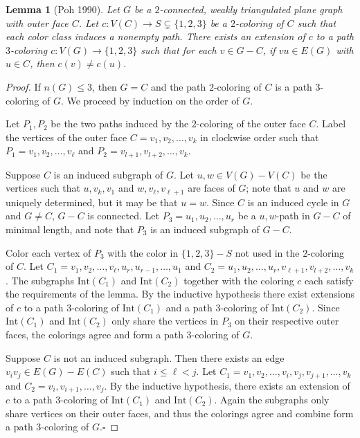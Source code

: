 \documentclass[12pt,letterpaper]{article}
\theoremstyle{plain}
\newtheorem{lemma}{Lemma}[section]           %
\theoremstyle{definition}
\theoremstyle{break}
\newcommand{\ggcqedsymbol}{$\square$}
\newcommand{\ggcqed}{\hbox{}\nobreak\hbox{\quad\ggcqedsymbol}}
\newcommand{\ggcnopf}{\ggcqed}
\begin{document}
\begin{lemma}[Poh 1990]\label{L:planar3c}
Let $G$ be a $2$-connected, weakly triangulated plane graph with outer face
$C$. Let $c:V(C)\to S\subsetneq\{1,2,3\}$ be a $2$-coloring of $C$ such
that each color class induces a nonempty path. There exists an extension of
$c$ to a path $3$-coloring $c:V(G)\to\{1,2,3\}$ such that for each $v\in G-C$, if $vu\in
E(G)$ with $u\in C$, then $c(v)\ne c(u)$.
\end{lemma}

\begin{proof}
If $n(G)\le 3$, then $G=C$ and the path $2$-coloring of $C$ is a path
$3$-coloring of $G$. We proceed by induction on the order of $G$. 

Let $P_1,P_2$ be the two paths induced by the $2$-coloring of the outer face
$C$. 
Label the vertices of the outer face $C=v_1,v_2,\ldots, v_k$ in clockwise
order such that $P_1=v_1,v_2,\ldots, v_\ell$ and
$P_2=v_{l+1},v_{l+2},\ldots, v_k$.

Suppose $C$ is an induced subgraph of $G$. Let
$u,w\in V(G)-V(C)$ be the vertices such that $u,v_k,v_1$ and $w,v_\ell,v_{\ell+1}$
are faces of $G$; note that
$u$ and $w$ are uniquely determined, but it may be that $u=w$. Since
$C$ is an induced cycle in $G$ and $G\ne C$, $G-C$ is connected.
Let $P_3=u_1,u_2,\ldots,u_r$ be a $u,w$-path in $G-C$ of minimal length, and
note that $P_3$ is an induced subgraph of $G-C$.

Color each vertex of $P_3$ with the color in $\{1,2,3\}- S$ not used
in the $2$-coloring of
$C$. Let $C_1=v_1,v_2,\ldots,v_\ell,u_r,u_{r-1},\ldots,u_1$ and
$C_2=u_1,u_2,\ldots,u_r,v_{\ell+1},v_{l+2},\ldots,v_k$. The subgraphs
$\text{Int}(C_1)$ and $\text{Int}(C_2)$ together with the coloring $c$
each satisfy the requirements of the lemma. By the inductive hypothesis
there exist extensions of $c$ to a path
$3$-coloring of $\text{Int}(C_1)$ and a path $3$-coloring of $\text{Int}(C_2)$.
Since $\text{Int}(C_1)$ and $\text{Int}(C_2)$ only share the vertices in $P_3$
on their respective outer faces, the colorings agree and form a path
$3$-coloring of $G$.

Suppose $C$ is not an induced subgraph. Then there
exists an edge $v_iv_j\in E(G)-E(C)$ such that $i\le \ell < j$. Let
$C_1=v_1,v_2,\ldots,v_i,v_j,v_{j+1},\ldots,v_k$
and $C_2=v_i,v_{i+1},\ldots,v_j$.
By the inductive hypothesis, there exists an extension of $c$ to a path
$3$-coloring of $\text{Int}(C_1)$ and $\text{Int}(C_2)$. Again
the subgraphs only share vertices on their outer faces, and thus the
colorings agree and combine form a path $3$-coloring of $G$.\ggcnopf
\end{proof}
\end{document}
